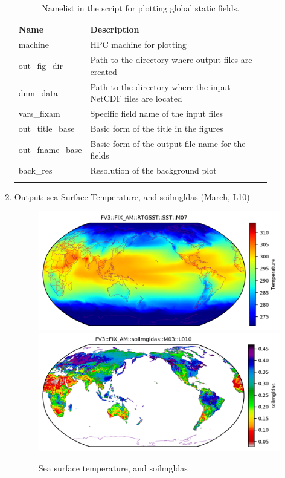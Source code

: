 \documentclass[11pt,fleqn]{report}              %
\begin{document}
\begin{enumerate}
{
\fontsize{10}{12}\selectfont
\begin{longtable}{p{0.15\linewidth} | p{0.72\linewidth} }
\hline
\hline
Name & Description \\
\hline
 machine & HPC machine for plotting \\
 out\_fig\_dir & Path to the directory where output files are created \\
 dnm\_data & Path to the directory where the input NetCDF files are located   \\
 vars\_fixam & Specific field name of the input files \\
 out\_title\_base & Basic form of the title in the figures \\
 out\_fname\_base & Basic form of the output file name for the fields \\
 back\_res & Resolution of the background plot \\
\hline
\caption{Namelist in the script for plotting global static fields.}
\label{table:fv3_var_fixam}
\end{longtable}
}

\item Output: sea Surface Temperature, and soilmgldas (March, L10)
\begin{figure}[ht!]
  \centering
  \includegraphics[width=0.6\linewidth]{fv3_fixam_RTGSST_m07.png}
  \includegraphics[width=0.6\linewidth]{fv3_fixam_soilmgldas_m03_L010.png}
  \caption{Sea surface temperature, and soilmgldas}
  \label{fig:py_fxam_sst}
\end{figure}

\end{enumerate}



\end{document}
